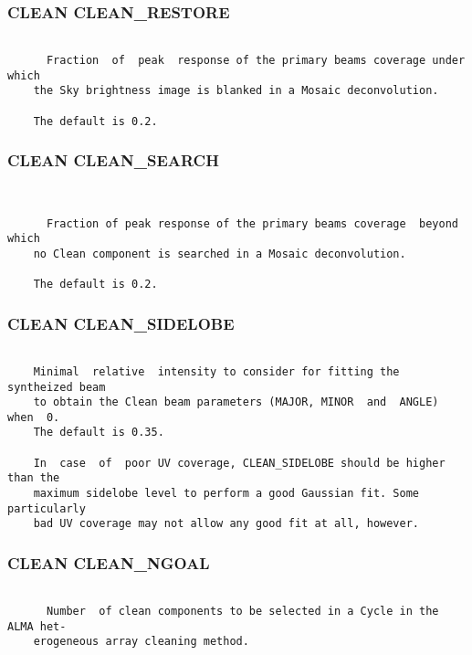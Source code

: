 \subsubsection{CLEAN CLEAN\_RESTORE}
\begin{verbatim}

      Fraction  of  peak  response of the primary beams coverage under which
    the Sky brightness image is blanked in a Mosaic deconvolution.

    The default is 0.2.

\end{verbatim}
\subsubsection{CLEAN CLEAN\_SEARCH}
\begin{verbatim}


      Fraction of peak response of the primary beams coverage  beyond  which
    no Clean component is searched in a Mosaic deconvolution.

    The default is 0.2.

\end{verbatim}
\subsubsection{CLEAN CLEAN\_SIDELOBE}
\begin{verbatim}

    Minimal  relative  intensity to consider for fitting the syntheized beam
    to obtain the Clean beam parameters (MAJOR, MINOR  and  ANGLE)  when  0.
    The default is 0.35.

    In  case  of  poor UV coverage, CLEAN_SIDELOBE should be higher than the
    maximum sidelobe level to perform a good Gaussian fit. Some particularly
    bad UV coverage may not allow any good fit at all, however.

\end{verbatim}
\subsubsection{CLEAN CLEAN\_NGOAL}
\begin{verbatim}

      Number  of clean components to be selected in a Cycle in the ALMA het-
    erogeneous array cleaning method.

\end{verbatim}
